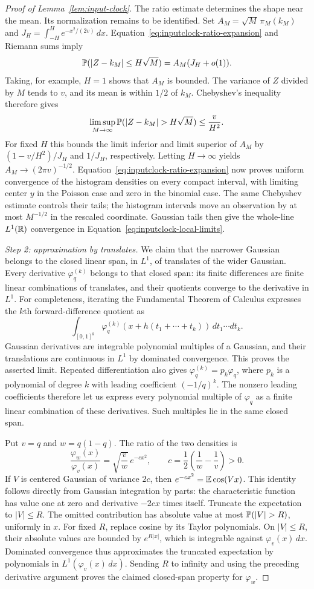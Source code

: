 \begin{proof}[Proof of Lemma~\ref{lem:input-clock}]
The ratio estimate determines the shape near the mean.  Its
normalization remains to be identified.  Set $A_M=\sqrt M\,\pi_M(k_M)$ and
$J_H=\int_{-H}^H e^{-x^2/(2v)}\,dx$.
Equation~\eqref{eq:inputclock-ratio-expansion} and Riemann sums imply
\[
 \P(|Z-k_M|\le H\sqrt M)=A_M(J_H+o(1)).
\]
Taking, for example, $H=1$ shows that $A_M$ is bounded.
The variance of $Z$ divided by $M$ tends to $v$, and its mean is within
$1/2$ of $k_M$.  Chebyshev's inequality therefore gives
\[
 \limsup_{M\to\infty}\P(|Z-k_M|>H\sqrt M)\le\frac{v}{H^2}.
\]
For fixed $H$ this bounds the limit inferior and limit superior of
$A_M$ by $(1-v/H^2)/J_H$ and $1/J_H$, respectively.  Letting
$H\to\infty$ yields
$A_M\to(2\pi v)^{-1/2}$.
Equation~\eqref{eq:inputclock-ratio-expansion} now proves uniform convergence
of the histogram densities on every compact interval, with limiting
center $y$ in the Poisson case and zero in the binomial case.
The same Chebyshev estimate controls their tails; the histogram
intervals move an observation by at most $M^{-1/2}$ in the rescaled
coordinate.  Gaussian tails then give the whole-line $L^1(\R)$ convergence
in Equation~\eqref{eq:inputclock-local-limits}.

\emph{Step 2: approximation by translates.}
We claim that the narrower Gaussian belongs to the closed linear span,
in $L^1$, of translates of the wider Gaussian.  Every derivative
$\varphi_q^{(k)}$ belongs to that closed span: its finite
differences are finite linear combinations of translates, and their
quotients converge to the derivative in $L^1$.  For completeness,
iterating the Fundamental Theorem of Calculus expresses the
$k$th forward-difference quotient as
\[
 \int_{[0,1]^k}\varphi_q^{(k)}
           (x+h(t_1+\cdots+t_k))\,dt_1\cdots dt_k.
\]
Gaussian derivatives are integrable polynomial multiples of a
Gaussian, and their translations are continuous in $L^1$ by dominated
convergence.  This proves the asserted limit.  Repeated differentiation
also gives $\varphi_q^{(k)}=p_k\varphi_q$, where $p_k$ is
a polynomial of degree $k$ with leading coefficient $(-1/q)^k$.
The nonzero leading coefficients therefore let us express every
polynomial multiple of $\varphi_q$ as a finite linear combination of
these derivatives.  Such multiples lie in the same closed span.

Put $v=q$ and $w=q(1-q)$.  The ratio of the two
densities is
\[
 \frac{\varphi_w(x)}{\varphi_v(x)}
 =\sqrt{\frac vw}\,e^{-c x^2},
 \qquad c=\frac12\left(\frac1w-\frac1v\right)>0.
\]
If $V$ is centered Gaussian of variance $2c$, then
$e^{-cx^2}=\E\cos(Vx)$.  This identity follows directly from Gaussian
integration by parts: the characteristic function has value one at
zero and derivative $-2cx$ times itself.  Truncate the expectation to
$|V|\le R$.  The omitted contribution has absolute value at most
$\P(|V|>R)$, uniformly in $x$.  For fixed $R$, replace cosine by its
Taylor polynomials.  On $|V|\le R$, their absolute values are bounded
by $e^{R|x|}$, which is integrable against $\varphi_v(x)\,dx$.
Dominated convergence thus approximates the truncated expectation by
polynomials in $L^1(\varphi_v(x)\,dx)$.  Sending $R$ to infinity and
using the preceding derivative argument proves the claimed closed-span
property for $\varphi_w$.


\end{proof}
